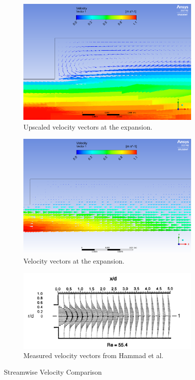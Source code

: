 \begin{figure}[H]
 \centering
\begin{subfigure}{.8\textwidth}
  \centering
  \includegraphics[width=.8\linewidth]{images/task1/vectors.png}
  \caption{Upscaled velocity vectors at the expansion.}
  \label{fig:vel_vel1}
\end{subfigure}%
\hfill
\begin{subfigure}{.8\textwidth}
  \centering
  \includegraphics[width=.8\linewidth]{images/task1/vectorsplot.png}
  \caption{Velocity vectors at the expansion.}
  \label{fig:vel_vel2}
\end{subfigure}
\hfill
\begin{subfigure}{.8\textwidth}
  \centering
  \includegraphics[width=.9\linewidth]{images/task1/vel_vectors.png}
  \caption{Measured velocity vectors from Hammad et al.\cite{hammad_ötügen_arik_1999}}
  \label{fig:vel_vel_measured}
\end{subfigure}

\caption{Streamwise Velocity Comparison}
\label{fig:vel_vec_comp}
\end{figure}

